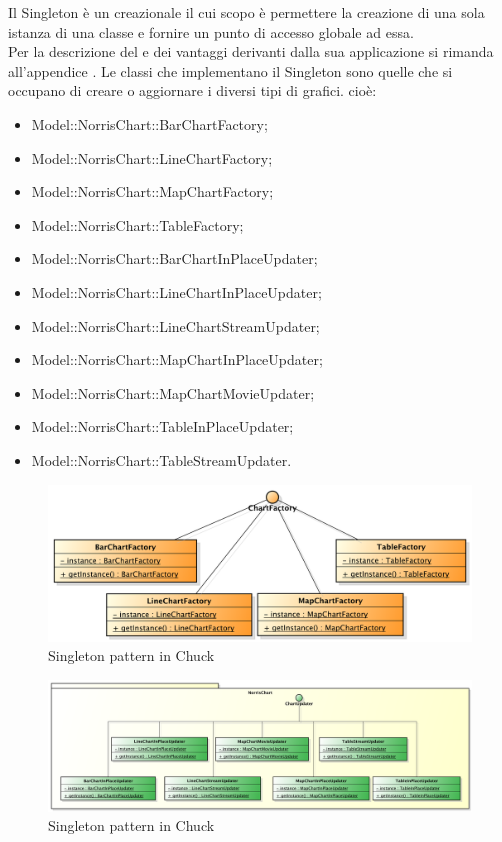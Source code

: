 			Il Singleton è un  creazionale il cui scopo è permettere la creazione di una sola istanza di una classe e fornire un punto di accesso globale ad essa.\\
			Per la descrizione del  e dei vantaggi derivanti dalla sua applicazione si rimanda all'appendice .
				Le classi che implementano il Singleton sono quelle che si occupano di creare o aggiornare i diversi tipi di grafici. cioè:
				\begin{itemize}
					\item Model::NorrisChart::BarChartFactory;
					\item Model::NorrisChart::LineChartFactory;
					\item Model::NorrisChart::MapChartFactory;
					\item Model::NorrisChart::TableFactory;
					\item Model::NorrisChart::BarChartInPlaceUpdater;
					\item Model::NorrisChart::LineChartInPlaceUpdater;
					\item Model::NorrisChart::LineChartStreamUpdater;
					\item Model::NorrisChart::MapChartInPlaceUpdater;
					\item Model::NorrisChart::MapChartMovieUpdater;
					\item Model::NorrisChart::TableInPlaceUpdater;
					\item Model::NorrisChart::TableStreamUpdater.
			\end{itemize}
			\begin{figure}[H]\centering
	        		\includegraphics[width=\textwidth]{SpecificaTecnica/Pics/DesignPatternNorris/Singleton2}
	        		\caption{Singleton pattern in Chuck}
	    		\end{figure}
	    		\begin{figure}[H]\centering
	        		\includegraphics[width=\textwidth]{SpecificaTecnica/Pics/DesignPatternNorris/Singleton1}
	        		\caption{Singleton pattern in Chuck}
	    		\end{figure}
						
